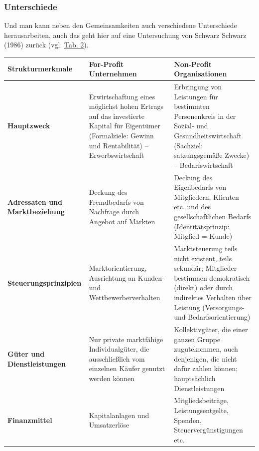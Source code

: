 \documentclass[
  letterpaper,
]{book}
\begin{document}
\subsubsection{Unterschiede}\label{npounterschiede}

Und man kann neben den Gemeinsamkeiten auch verschiedene Unterschiede
herausarbeiten, auch das geht hier auf eine Untersuchung von Schwarz
Schwarz (1986) zurück (vgl. \hyperref[table2]{Tab. 2}).

\begin{longtable}[]{@{}
  >{\raggedright\arraybackslash}p{}
  >{\raggedright\arraybackslash}p{}
  >{\raggedright\arraybackslash}p{}@{}}
\toprule\noalign{}
\begin{minipage}[b]{\linewidth}\raggedright
\textbf{Strukturmerkmale}
\end{minipage} & \begin{minipage}[b]{\linewidth}\raggedright
\textbf{For-Profit Unternehmen}
\end{minipage} & \begin{minipage}[b]{\linewidth}\raggedright
\textbf{Non-Profit Organisationen}
\end{minipage} \\
\midrule\noalign{}
\endhead
\bottomrule\noalign{}
\endlastfoot
\textbf{Hauptzweck} & Erwirtschaftung eines möglichst hohen Ertrags auf
das investierte Kapital für Eigentümer (Formalziele: Gewinn und
Rentabilität) -- Erwerbswirtschaft & Erbringung von Leistungen für
bestimmten Personenkreis in der Sozial- und Gesundheitswirtschaft
(Sachziel: satzungsgemäße Zwecke) -- Bedarfswirtschaft \\
\textbf{Adressaten und Marktbeziehung} & Deckung des Fremdbedarfs von
Nachfrage durch Angebot auf Märkten & Deckung des Eigenbedarfs von
Mitgliedern, Klienten etc. und des gesellschaftlichen Bedarfs
(Identitätsprinzip: Mitglied = Kunde) \\
\textbf{Steuerungsprinzipien} & Marktorientierung, Ausrichtung an
Kunden- und Wettbewerberverhalten & Marktsteuerung teils nicht existent,
teils sekundär; Mitglieder bestimmen demokratisch (direkt) oder durch
indirektes Verhalten über Leistung (Versorgungs- und
Bedarfsorientierung) \\
\textbf{Güter und Dienstleistungen} & Nur private marktfähige
Individualgüter, die ausschließlich vom einzelnen Käufer genutzt werden
können & Kollektivgüter, die einer ganzen Gruppe zugutekommen, auch
denjenigen, die nicht dafür zahlen können; hauptsächlich
Dienstleistungen \\
\textbf{Finanzmittel} & Kapitalanlagen und Umsatzerlöse &
Mitgliedsbeiträge, Leistungsentgelte, Spenden, Steuervergünstigungen
etc. \\
\end{longtable}
\end{document}
